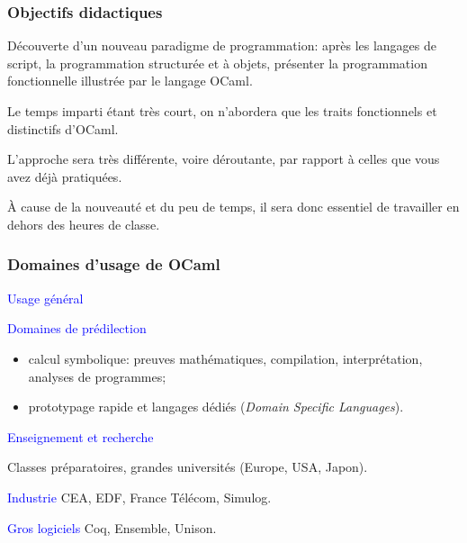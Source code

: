 
%
\begin{frame}
\frametitle{Objectifs didactiques}

Découverte d'un nouveau paradigme de programmation: après les langages
de script, la programmation structurée et à objets, présenter la
programmation fonctionnelle illustrée par le langage OCaml.

\bigskip

Le temps imparti étant très court, on n'abordera que les traits
fonctionnels et distinctifs d'OCaml.

\bigskip

L'approche sera très différente, voire déroutante, par rapport à
celles que vous avez déjà pratiquées.

\bigskip

À cause de la nouveauté et du peu de temps, il sera donc essentiel de
travailler en dehors des heures de classe.

\end{frame}

%
\begin{frame}
\frametitle{Domaines d'usage de OCaml}

\textcolor{blue}{Usage général}

\bigskip

\textcolor{blue}{Domaines de prédilection}

\begin{itemize}

  \item calcul symbolique: preuves mathématiques, compilation,
        interprétation, analyses de programmes;

  \item prototypage rapide et langages dédiés (\emph{Domain Specific
        Languages}).

\end{itemize}

\textcolor{blue}{Enseignement et recherche}

Classes préparatoires, grandes universités (Europe, USA, Japon).

\bigskip

\textcolor{blue}{Industrie} CEA, EDF, France Télécom, Simulog.

\bigskip

\textcolor{blue}{Gros logiciels} Coq, Ensemble, Unison.

\end{frame}

